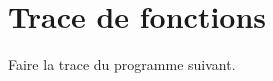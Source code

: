 
\newcommand{\commentaire}[1]{}


\vspace{-2cm}

\section{Trace de fonctions}

\begin{newenu}
\item  Faire la trace du programme suivant.
\end{newenu}
{
\footnotesize
{}
}


